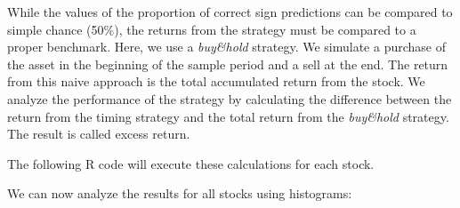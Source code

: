 \documentclass[11pt,]{book}
\newenvironment{Shaded}{\begin{snugshade}}{\end{snugshade}}
\newcommand{\KeywordTok}[1]{\textcolor[rgb]{0.27,0.27,0.27}{\textbf{#1}}}
\newcommand{\DataTypeTok}[1]{\textcolor[rgb]{0.27,0.27,0.27}{#1}}
\newcommand{\DecValTok}[1]{\textcolor[rgb]{0.06,0.06,0.06}{#1}}
\newcommand{\StringTok}[1]{\textcolor[rgb]{0.5,0.5,0.5}{#1}}
\newcommand{\CommentTok}[1]{\textcolor[rgb]{0.56,0.35,0.01}{\textit{#1}}}
\newcommand{\OperatorTok}[1]{\textcolor[rgb]{0.81,0.36,0.00}{\textbf{#1}}}
\newcommand{\NormalTok}[1]{#1}
\begin{document}
While the values of the proportion of correct sign predictions can be
compared to simple chance (50\%), the returns from the strategy must be
compared to a proper benchmark. Here, we use a \emph{buy\&hold}
strategy. We simulate a purchase of the asset in the beginning of the
sample period and a sell at the end. The return from this naive approach
is the total accumulated return from the stock. We analyze the
performance of the strategy by calculating the difference between the
return from the timing strategy and the total return from the
\emph{buy\&hold} strategy. The result is called excess return.

The following R code will execute these calculations for each stock.

\begin{Shaded}
\end{Shaded}

We can now analyze the results for all stocks using histograms:
\end{document}

